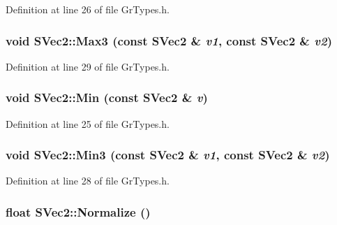 Definition at line 26 of file GrTypes.h.\hypertarget{struct_s_vec2_fc34a31b79ddcf44936040b6fd6f360a}{
\subsubsection[{Max3}]{\setlength{\rightskip}{0pt plus 5cm}void SVec2::Max3 (const {\bf SVec2} \& {\em v1}, \/  const {\bf SVec2} \& {\em v2})}}
\label{struct_s_vec2_fc34a31b79ddcf44936040b6fd6f360a}




Definition at line 29 of file GrTypes.h.\hypertarget{struct_s_vec2_fe64c54a3bd10fe8cfcb45d16ea1aa4f}{
\subsubsection[{Min}]{\setlength{\rightskip}{0pt plus 5cm}void SVec2::Min (const {\bf SVec2} \& {\em v})}}
\label{struct_s_vec2_fe64c54a3bd10fe8cfcb45d16ea1aa4f}




Definition at line 25 of file GrTypes.h.\hypertarget{struct_s_vec2_587ea700a22c39a87fb928b78bb43959}{
\subsubsection[{Min3}]{\setlength{\rightskip}{0pt plus 5cm}void SVec2::Min3 (const {\bf SVec2} \& {\em v1}, \/  const {\bf SVec2} \& {\em v2})}}
\label{struct_s_vec2_587ea700a22c39a87fb928b78bb43959}




Definition at line 28 of file GrTypes.h.\hypertarget{struct_s_vec2_3dcd2a390aa3ad0520f6721f104fc029}{
\subsubsection[{Normalize}]{\setlength{\rightskip}{0pt plus 5cm}float SVec2::Normalize ()}}
\label{struct_s_vec2_3dcd2a390aa3ad0520f6721f104fc029}





